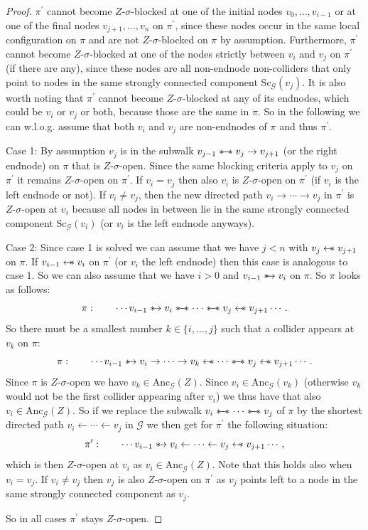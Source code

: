 \documentclass[accepted]{uai2025} %
\newcommand{\tuh}{\mathrel{\rightarrow}}
\newcommand{\hut}{\mathrel{\leftarrow}}
\newcommand{\hus}{\mathrel{{\leftarrow\mkern-11mu\ast}}}
\newcommand{\suh}{\mathrel{{\ast\mkern-11mu\to}}}
\newcommand{\sus}{\mathrel{{\ast\mkern-11mu\relbar\mkern-9mu\relbar\mkern-11mu\ast}}}
\begin{document}
\begin{proof}
$\pi^{\prime}$ cannot become $Z$-$\sigma$-blocked at one of the initial nodes $v_{0},\ldots,v_{i-1}$ or at one of the final nodes $v_{j+1},\ldots,v_{n}$ on $\pi^{\prime}$, since these nodes occur in the same local configuration on $\pi$ and are not $Z$-$\sigma$-blocked on $\pi$ by assumption. Furthermore, $\pi^{\prime}$ cannot become $Z$-$\sigma$-blocked at one of the nodes strictly between $v_{i}$ and $v_{j}$ on $\pi^{\prime}$ (if there are any), since these nodes are all non-endnode non-colliders that only point to nodes in the same strongly connected component $\mathrm{Sc}_\mathcal{G}(v_{j})$. It is also worth noting that $\pi^{\prime}$ cannot become $Z$-$\sigma$-blocked at any of its endnodes, which could be $v_{i}$ or $v_{j}$ or both, because those are the same in $\pi$. So in the following we can w.l.o.g. assume that both $v_{i}$ and $v_{j}$ are non-endnodes of $\pi$ and thus $\pi^{\prime}$.

Case 1: By assumption $v_{j}$ is in the subwalk $v_{j-1}\sus v_j\tuh v_{j+1}$ (or the right endnode) on $\pi$ that is $Z$-$\sigma$-open. Since the same blocking criteria apply to $v_{j}$ on $\pi^{\prime}$ it remains $Z$-$\sigma$-open on $\pi^{\prime}$. If $v_{i}=v_{j}$ then also $v_{i}$ is $Z$-$\sigma$-open on $\pi^{\prime}$ (if $v_{i}$ is the left endnode or not). If $v_{i}\neq v_{j}$, then the new directed path $v_{i}\tuh\cdots\tuh v_{j}$ in $\pi^{\prime}$ is $Z$-$\sigma$-open at $v_{i}$ because all nodes in between lie in the same strongly connected component $\mathrm{Sc}_\mathcal{G}(v_{i})$ (or $v_{i}$ is the left endnode anyways).

Case 2: Since case 1 is solved we can assume that we have $j<n$ with $v_{j}\hus v_{j+1}$ on $\pi$. If $v_{i-1}\hus v_{i}$ on $\pi^{\prime}$ (or $v_{i}$ the left endnode) then this case is analogous to case 1. So we can also assume that we have $i>0$ and $v_{i-1}\suh v_{i}$ on $\pi$. So $\pi$ looks as follows:
\[
\pi:\qquad\cdots v_{i-1}\suh v_{i}\sus\cdots \sus v_{j}\hus v_{j+1}\cdots.
\]
So there must be a smallest number $k\in\{i,\ldots,j\}$ such that a collider appears at $v_{k}$ on $\pi$:
\[
\pi:\qquad\cdots v_{i-1}\suh v_{i}\tuh\cdots \tuh v_{k}\hus\cdots\sus v_{j}\hus v_{j+1}\cdots.
\]
Since $\pi$ is $Z$-$\sigma$-open we have $v_{k}\in\mathrm{Anc}_\mathcal{G}(Z)$. Since $v_{i}\in\mathrm{Anc}_\mathcal{G}(v_{k})$ (otherwise $v_{k}$ would not be the first collider appearing after $v_{i}$) we thus have that also $v_{i}\in\mathrm{Anc}_\mathcal{G}(Z)$. So if we replace the subwalk $v_{i}\sus\cdots\sus v_{j}$ of $\pi$ by the shortest directed path $v_{i}\hut\cdots\hut v_{j}$ in $\mathcal{G}$ we then get for $\pi^{\prime}$ the following situation:
\[
\pi^{\prime}:\qquad\cdots v_{i-1}\suh v_{i}\hut\cdots \hut v_{j}\hus v_{j+1}\cdots,
\]
which is then $Z$-$\sigma$-open at $v_{i}$ as $v_{i}\in\mathrm{Anc}_\mathcal{G}(Z)$. Note that this holds also when $v_{i}=v_{j}$. If $v_{i}\neq v_{j}$ then $v_{j}$ is also $Z$-$\sigma$-open on $\pi^{\prime}$ as $v_{j}$ points left to a node in the same strongly connected component as $v_{j}$.

So in all cases $\pi^{\prime}$ stays $Z$-$\sigma$-open.
\end{proof}
\end{document}
